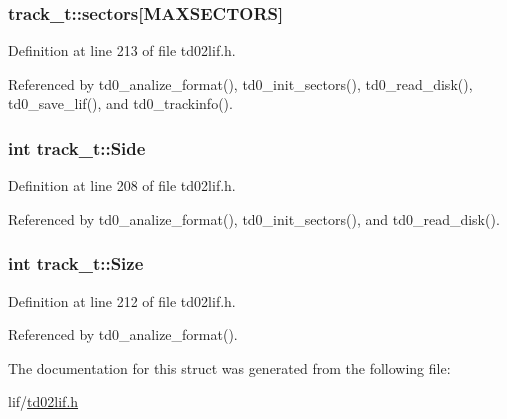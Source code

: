 \subsubsection[{\texorpdfstring{sectors}{sectors}}]{ track\+\_\+t\+::sectors\mbox{[}{\bf M\+A\+X\+S\+E\+C\+T\+O\+RS}\mbox{]}}\hypertarget{structtrack__t_af5a5bc7c09b032d06fe21a18f08772db}{}\label{structtrack__t_af5a5bc7c09b032d06fe21a18f08772db}


Definition at line 213 of file td02lif.\+h.



Referenced by td0\+\_\+analize\+\_\+format(), td0\+\_\+init\+\_\+sectors(), td0\+\_\+read\+\_\+disk(), td0\+\_\+save\+\_\+lif(), and td0\+\_\+trackinfo().

\subsubsection[{\texorpdfstring{Side}{Side}}]{\setlength{\rightskip}{0pt plus 5cm}int track\+\_\+t\+::\+Side}\hypertarget{structtrack__t_ad8ed890a8194525d7162dee414180635}{}\label{structtrack__t_ad8ed890a8194525d7162dee414180635}


Definition at line 208 of file td02lif.\+h.



Referenced by td0\+\_\+analize\+\_\+format(), td0\+\_\+init\+\_\+sectors(), and td0\+\_\+read\+\_\+disk().

\subsubsection[{\texorpdfstring{Size}{Size}}]{\setlength{\rightskip}{0pt plus 5cm}int track\+\_\+t\+::\+Size}\hypertarget{structtrack__t_ab0e996e402d1d61b694b80a1c866177e}{}\label{structtrack__t_ab0e996e402d1d61b694b80a1c866177e}


Definition at line 212 of file td02lif.\+h.



Referenced by td0\+\_\+analize\+\_\+format().



The documentation for this struct was generated from the following file\+:\begin{DoxyCompactItemize}
\item 
lif/\hyperlink{td02lif_8h}{td02lif.\+h}\end{DoxyCompactItemize}
